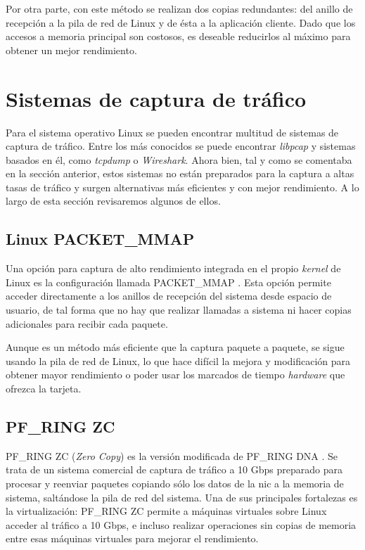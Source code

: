 \documentclass[twoside, 12pt]{epstfg}
\begin{document}
Por otra parte, con este método se realizan dos copias redundantes: del anillo de recepción a la pila de red de Linux y de ésta a la aplicación cliente. Dado que los accesos a memoria principal son costosos, es deseable reducirlos al máximo para obtener un mejor rendimiento.

\section{Sistemas de captura de tráfico}

Para el sistema operativo Linux se pueden encontrar multitud de sistemas de captura de tráfico. Entre los más conocidos se puede encontrar \textit{libpcap} y sistemas basados en él, como \textit{tcpdump} o \textit{Wireshark}. Ahora bien, tal y como se comentaba en la sección anterior, estos sistemas no están preparados para la captura a altas tasas de tráfico y surgen alternativas más eficientes y con mejor rendimiento. A lo largo de esta sección revisaremos algunos de ellos.

\subsection{Linux PACKET\_MMAP}

Una opción para captura de alto rendimiento integrada en el propio \textit{kernel} de Linux es la configuración llamada PACKET\_MMAP \cite{packetmmap}. Esta opción permite acceder directamente a los anillos de recepción del sistema desde espacio de usuario, de tal forma que no hay que realizar llamadas a sistema ni hacer copias adicionales para recibir cada paquete.

Aunque es un método más eficiente que la captura paquete a paquete, se sigue usando la pila de red de Linux, lo que hace difícil la mejora y modificación para obtener mayor rendimiento o poder usar los marcados de tiempo \textit{hardware} que ofrezca la tarjeta.

\subsection{PF\_RING ZC}

PF\_RING ZC (\textit{Zero Copy}) es la versión modificada de PF\_RING DNA \cite{rizzo201210}. Se trata de un sistema comercial de captura de tráfico a 10 Gbps preparado para procesar y reenviar paquetes copiando sólo los datos de la \gls{nic} a la memoria de sistema, saltándose la pila de red del sistema. Una de sus principales fortalezas es la virtualización: PF\_RING ZC permite a máquinas virtuales sobre Linux acceder al tráfico a 10 Gbps, e incluso realizar operaciones sin copias de memoria entre esas máquinas virtuales para mejorar el rendimiento.
\end{document}
